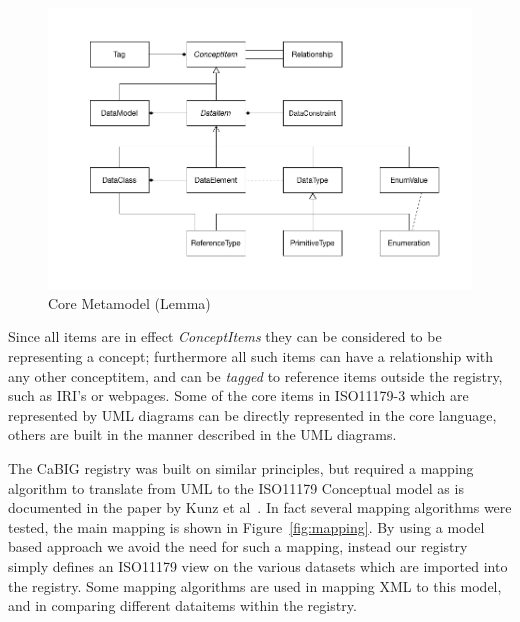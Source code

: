 \documentclass{llncs}
\begin{document}
\begin{figure}[h]
\includegraphics[width=1.0\textwidth,natwidth=610,natheight=642]{LemmaCore1}
\caption{Core Metamodel (Lemma)} 
\label{fig:lemma}
\end{figure}

Since all items are in effect \emph{ConceptItems} they can be considered to be representing a concept; furthermore all such items can have a relationship with any other conceptitem, and can be \emph{tagged} to reference items outside the registry, such as IRI's or webpages. Some of the core items in ISO11179-3 which are represented by UML diagrams can be directly represented in the core language, others are built in the manner described in the UML diagrams. 

The CaBIG registry was built on similar principles, but required a mapping algorithm to translate from UML to the ISO11179 Conceptual model as is documented in the paper by Kunz et al~\cite{Kunz2009}. In fact several mapping algorithms were tested, the main mapping is shown in Figure~\ref{fig:mapping}. By using a model based approach we avoid the need for such a mapping, instead our registry simply defines an ISO11179 view on the various datasets which are imported into the registry.  Some mapping algorithms are used in mapping XML to this model, and in comparing different dataitems within the registry.
\end{document}
